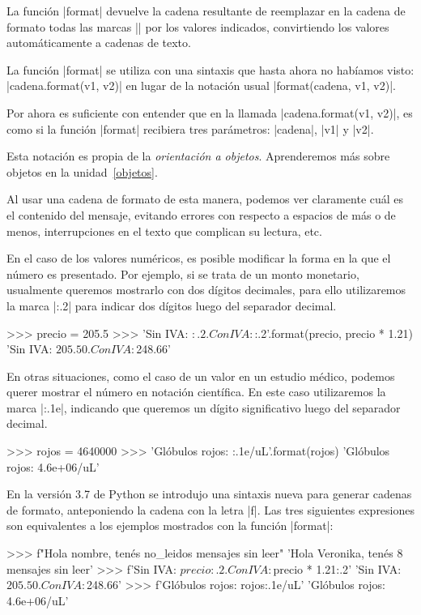 La función |format| devuelve la cadena resultante de reemplazar en la cadena de
formato todas las marcas |{}| por los valores indicados, convirtiendo los
valores automáticamente a cadenas de texto.

\begin{sabias_que}
La función |format| se utiliza con una sintaxis que hasta ahora no habíamos
visto: |cadena.format(v1, v2)| en lugar de la notación usual
|format(cadena, v1, v2)|.

Por ahora es suficiente con entender que en la llamada
|cadena.format(v1, v2)|,
es como si la función |format| recibiera tres parámetros: |cadena|,
|v1| y |v2|.

Esta notación es propia de la \emph{orientación a objetos}. Aprenderemos más
sobre objetos en la unidad~\ref{objetos}.
\end{sabias_que}

Al usar una cadena de formato de
esta manera, podemos ver claramente cuál es el contenido del mensaje, evitando
errores con respecto a espacios de más o de menos, interrupciones en el texto
que complican su lectura, etc.

En el caso de los valores numéricos, es posible modificar la forma en la que el
número es presentado. Por ejemplo, si se trata de un monto monetario, usualmente
queremos mostrarlo con dos dígitos decimales, para ello utilizaremos la
marca |{:.2}| para indicar dos dígitos luego del separador decimal.

\begin{codigo-python-sn}
>>> precio = 205.5
>>> 'Sin IVA: ${:.2}. Con IVA: ${:.2}'.format(precio, precio * 1.21)
'Sin IVA: $205.50. Con IVA: $248.66'
\end{codigo-python-sn}

En otras situaciones, como el caso de un valor en un estudio médico, podemos
querer mostrar el número en notación científica. En este caso utilizaremos la
marca |{:.1e}|, indicando que queremos un dígito significativo luego del separador
decimal.

\begin{codigo-python-sn}
>>> rojos = 4640000
>>> 'Glóbulos rojos: {:.1e}/uL'.format(rojos)
'Glóbulos rojos: 4.6e+06/uL'
\end{codigo-python-sn}

\begin{sabias_que}
En la versión 3.7 de Python se introdujo una sintaxis nueva para generar
cadenas de formato, anteponiendo la cadena con la letra |f|. Las tres
siguientes expresiones son equivalentes a los ejemplos mostrados con la
función |format|:

\begin{codigo-python-sn}
>>> f"Hola {nombre}, tenés {no_leidos} mensajes sin leer"
'Hola Veronika, tenés 8 mensajes sin leer'
>>> f'Sin IVA: ${precio:.2}. Con IVA: ${precio * 1.21:.2}'
'Sin IVA: $205.50. Con IVA: $248.66'
>>> f'Glóbulos rojos: {rojos:.1e}/uL'
'Glóbulos rojos: 4.6e+06/uL'
\end{codigo-python-sn}
\end{sabias_que}



